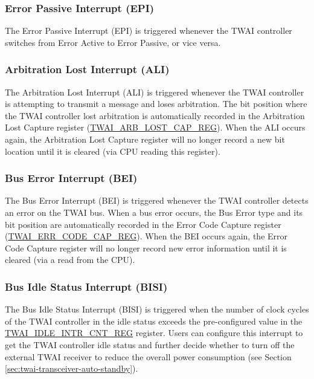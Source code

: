 \documentclass[main\_\_EN.tex]{subfiles}
\begin{document}
\subsubsection{Error Passive Interrupt (EPI)}
\label{other:twai-para-epi}
The Error Passive Interrupt (EPI) is triggered whenever the TWAI controller switches from Error Active to Error Passive, or vice versa.

\subsubsection{Arbitration Lost Interrupt (ALI)}
\label{other:twai-para-ali}
The Arbitration Lost Interrupt (ALI) is triggered whenever the TWAI controller is attempting to transmit a message and loses arbitration. The bit position where the TWAI controller lost arbitration is automatically recorded in the Arbitration Lost Capture register (\hyperref[regdesc:TWAIARBLOSTCAPREG]{TWAI\_ARB\_LOST\_CAP\_REG}). When the ALI occurs again, the Arbitration Lost Capture register will no longer record a new bit location until it is cleared (via CPU reading this register).

\subsubsection{Bus Error Interrupt (BEI)}
\label{other:twai-para-bei}
The Bus Error Interrupt (BEI) is triggered whenever the TWAI controller detects an error on the TWAI bus. When a bus error occurs, the Bus Error type and its bit position are automatically recorded in the Error Code Capture register (\hyperref[regdesc:TWAIERRCODECAPREG]{TWAI\_ERR\_CODE\_CAP\_REG}). When the BEI occurs again, the Error Code Capture register will no longer record new error information until it is cleared (via a read from the CPU).

\subsubsection{Bus Idle Status Interrupt (BISI)}
\label{other:twai-para-bisi}
The Bus Idle Status Interrupt (BISI) is triggered when the number of clock cycles of the TWAI controller in the idle status exceeds the pre-configured value in the \hyperref[regdesc:TWAIIDLEINTRCNTREG]{TWAI\_IDLE\_INTR\_CNT\_REG} register. Users can configure this interrupt to get the TWAI controller idle status and further decide whether to turn off the external TWAI receiver to reduce the overall power consumption (see Section \ref{sec:twai-transceiver-auto-standby}).
\end{document}
